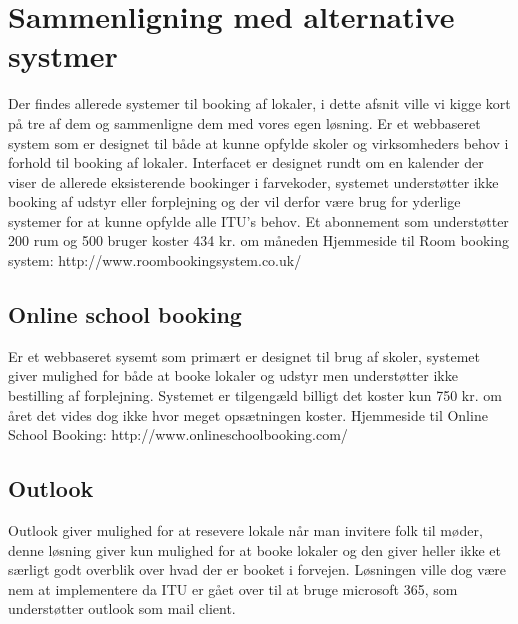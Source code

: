 \chapter{Sammenligning med alternative systmer}
Der findes allerede systemer til booking af lokaler, i dette afsnit ville vi kigge kort på tre af dem og sammenligne dem med vores egen løsning.
Er et webbaseret system som er designet til både at kunne opfylde skoler og virksomheders behov i forhold til booking af lokaler. Interfacet er designet rundt om en kalender der viser de allerede eksisterende bookinger i farvekoder, systemet understøtter ikke booking af udstyr eller forplejning og der vil derfor være brug for yderlige systemer for at kunne opfylde alle ITU's behov. Et abonnement som understøtter 200 rum og 500 bruger koster 434 kr. om måneden
Hjemmeside til Room booking system: http://www.roombookingsystem.co.uk/

\section{Online school booking}
Er et webbaseret sysemt som primært er designet til brug af skoler, systemet giver mulighed for både at booke lokaler og udstyr men understøtter ikke bestilling af forplejning. Systemet er tilgengæld billigt det koster kun 750 kr. om året det vides dog ikke hvor meget opsætningen koster. 
Hjemmeside til Online School Booking: http://www.onlineschoolbooking.com/

\section{Outlook}
Outlook giver mulighed for at resevere lokale når man invitere folk til møder, denne løsning giver kun mulighed for at booke lokaler og den giver heller ikke et særligt godt overblik over hvad der er booket i forvejen. Løsningen ville dog være nem at implementere da ITU er gået over til at bruge microsoft 365, som understøtter outlook som mail client.
